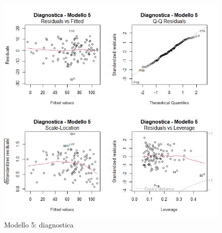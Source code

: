 \begin{figure}[H]
	\centering
	\includegraphics[width=0.75\linewidth]{graphs/diagnostica/modello5}
	\caption{Modello 5: diagnostica}
	\label{fig:diagnostica_modello5}
\end{figure}


